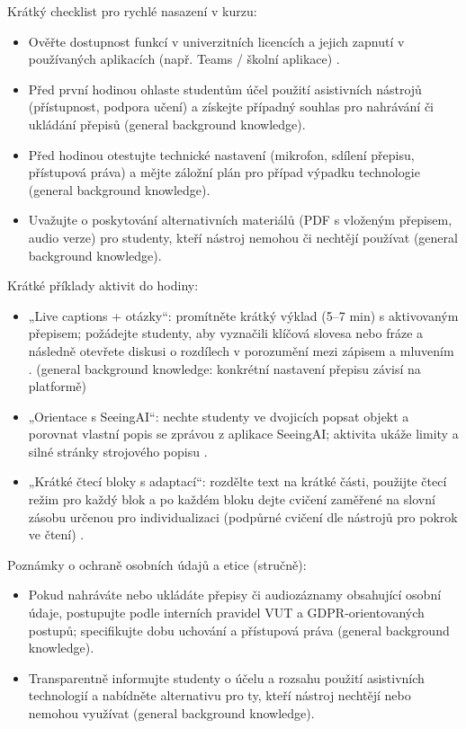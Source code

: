 \documentclass{report}%
\begin{document}
Krátký checklist pro rychlé nasazení v kurzu:
\begin{itemize}
  \item Ověřte dostupnost funkcí v univerzitních licencích a jejich zapnutí v používaných aplikacích (např. Teams / školní aplikace) \cite{kb_ai_101_tipu_pdf_04e4a115_page_7_1}. 
  \item Před první hodinou ohlaste studentům účel použití asistivních nástrojů (přístupnost, podpora učení) a získejte případný souhlas pro nahrávání či ukládání přepisů (general background knowledge).
  \item Před hodinou otestujte technické nastavení (mikrofon, sdílení přepisu, přístupová práva) a mějte záložní plán pro případ výpadku technologie (general background knowledge).
  \item Uvažujte o poskytování alternativních materiálů (PDF s vloženým přepisem, audio verze) pro studenty, kteří nástroj nemohou či nechtějí používat (general background knowledge).
\end{itemize}

Krátké příklady aktivit do hodiny:
\begin{itemize}
  \item „Live captions + otázky“: promítněte krátký výklad (5–7 min) s aktivovaným přepisem; požádejte studenty, aby vyznačili klíčová slovesa nebo fráze a následně otevřete diskusi o rozdílech v porozumění mezi zápisem a mluvením \cite{kb_ai_101_tipu_pdf_04e4a115_page_11_1}. (general background knowledge: konkrétní nastavení přepisu závisí na platformě)
  \item „Orientace s SeeingAI“: nechte studenty ve dvojicích popsat objekt a porovnat vlastní popis se zprávou z aplikace SeeingAI; aktivita ukáže limity a silné stránky strojového popisu \cite{kb_ai_101_tipu_pdf_04e4a115_page_11_1}.
  \item „Krátké čtecí bloky s adaptací“: rozdělte text na krátké části, použijte čtecí režim pro každý blok a po každém bloku dejte cvičení zaměřené na slovní zásobu určenou pro individualizaci (podpůrné cvičení dle nástrojů pro pokrok ve čtení) \cite{kb_ai_101_tipu_pdf_04e4a115_page_7_1}.
\end{itemize}

Poznámky o ochraně osobních údajů a etice (stručně):
\begin{itemize}
  \item Pokud nahráváte nebo ukládáte přepisy či audiozáznamy obsahující osobní údaje, postupujte podle interních pravidel VUT a GDPR‑orientovaných postupů; specifikujte dobu uchování a přístupová práva (general background knowledge).
  \item Transparentně informujte studenty o účelu a rozsahu použití asistivních technologií a nabídněte alternativu pro ty, kteří nástroj nechtějí nebo nemohou využívat (general background knowledge).
\end{itemize}
\end{document}
